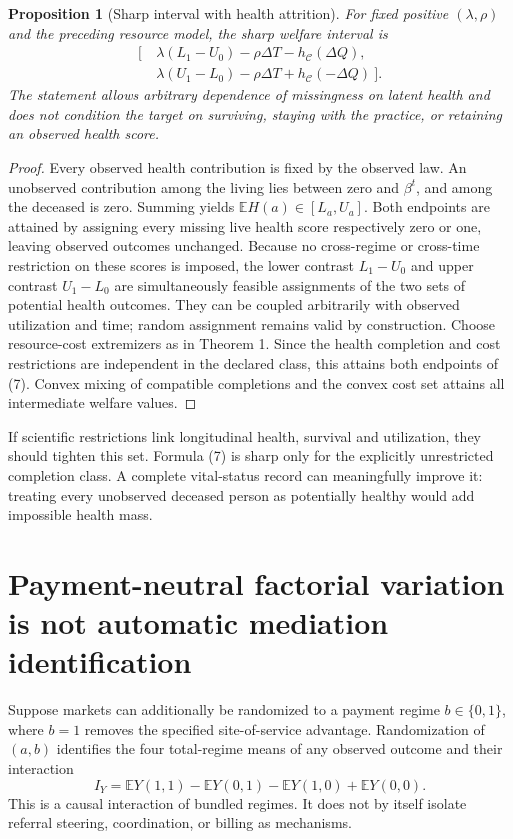 \documentclass[11pt]{article}
\newtheorem{proposition}[theorem]{Proposition}
\theoremstyle{remark}
\newcommand{\E}{\mathbb E}
\begin{document}
\begin{proposition}[Sharp interval with health attrition]
For fixed positive $(\lambda,\rho)$ and the preceding resource model, the sharp welfare interval is
\[
\begin{aligned}
[\ &\lambda(L_1-U_0)-\rho\Delta T-h_{\mathcal C}(\Delta Q),\\
   &\lambda(U_1-L_0)-\rho\Delta T+h_{\mathcal C}(-\Delta Q)\ ].   \end{aligned}\tag{7}
\]
The statement allows arbitrary dependence of missingness on latent health and does not condition the target on surviving, staying with the practice, or retaining an observed health score.
\end{proposition}
\begin{proof}
Every observed health contribution is fixed by the observed law. An unobserved contribution among the living lies between zero and $\beta^t$, and among the deceased is zero. Summing yields $\E H(a)\in[L_a,U_a]$. Both endpoints are attained by assigning every missing live health score respectively zero or one, leaving observed outcomes unchanged. Because no cross-regime or cross-time restriction on these scores is imposed, the lower contrast $L_1-U_0$ and upper contrast $U_1-L_0$ are simultaneously feasible assignments of the two sets of potential health outcomes. They can be coupled arbitrarily with observed utilization and time; random assignment remains valid by construction. Choose resource-cost extremizers as in Theorem 1. Since the health completion and cost restrictions are independent in the declared class, this attains both endpoints of (7). Convex mixing of compatible completions and the convex cost set attains all intermediate welfare values.
\end{proof}

If scientific restrictions link longitudinal health, survival and utilization, they should tighten this set. Formula (7) is sharp only for the explicitly unrestricted completion class. A complete vital-status record can meaningfully improve it: treating every unobserved deceased person as potentially healthy would add impossible health mass.

\section{Payment-neutral factorial variation is not automatic mediation identification}
Suppose markets can additionally be randomized to a payment regime $b\in\{0,1\}$, where $b=1$ removes the specified site-of-service advantage. Randomization of $(a,b)$ identifies the four total-regime means of any observed outcome and their interaction
\[
 I_Y=\E Y(1,1)-\E Y(0,1)-\E Y(1,0)+\E Y(0,0).            \tag{8}
\]
This is a causal interaction of bundled regimes. It does not by itself isolate referral steering, coordination, or billing as mechanisms.
\end{document}
